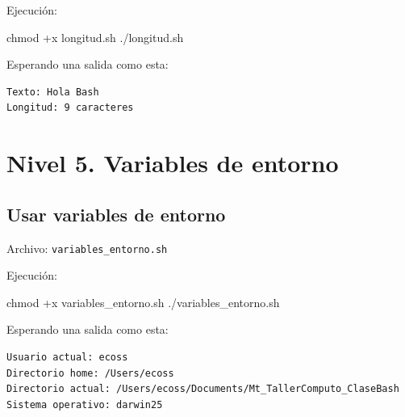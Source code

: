 \documentclass[
  spanish,
  12pt,
  letterpaper,
  DIV=11,
  numbers=noendperiod]{scrreprt}
\newenvironment{Shaded}{\begin{snugshade}}{\end{snugshade}}
\newcommand{\BuiltInTok}[1]{\textcolor[rgb]{0.00,0.23,0.31}{#1}}
\newcommand{\CommentTok}[1]{\textcolor[rgb]{0.37,0.37,0.37}{#1}}
\newcommand{\ExtensionTok}[1]{\textcolor[rgb]{0.00,0.23,0.31}{#1}}
\newcommand{\FunctionTok}[1]{\textcolor[rgb]{0.28,0.35,0.67}{#1}}
\newcommand{\NormalTok}[1]{\textcolor[rgb]{0.00,0.23,0.31}{#1}}
\newcommand{\StringTok}[1]{\textcolor[rgb]{0.13,0.47,0.30}{#1}}
\newcommand{\VariableTok}[1]{\textcolor[rgb]{0.07,0.07,0.07}{#1}}
\begin{document}
Ejecución:

\begin{Shaded}
\begin{Highlighting}[]
\FunctionTok{chmod}\NormalTok{ +x longitud.sh}
\ExtensionTok{./longitud.sh}
\end{Highlighting}
\end{Shaded}

Esperando una salida como esta:

\begin{verbatim}
Texto: Hola Bash
Longitud: 9 caracteres
\end{verbatim}

\section{Nivel 5. Variables de
entorno}\label{nivel-5.-variables-de-entorno}

\subsection{Usar variables de entorno}\label{usar-variables-de-entorno}

Archivo: \texttt{variables\_entorno.sh}

\begin{Shaded}
\end{Shaded}

Ejecución:

\begin{Shaded}
\begin{Highlighting}[]
\FunctionTok{chmod}\NormalTok{ +x variables\_entorno.sh}
\ExtensionTok{./variables\_entorno.sh}
\end{Highlighting}
\end{Shaded}

Esperando una salida como esta:

\begin{verbatim}
Usuario actual: ecoss
Directorio home: /Users/ecoss
Directorio actual: /Users/ecoss/Documents/Mt_TallerComputo_ClaseBash
Sistema operativo: darwin25
\end{verbatim}
\end{document}

